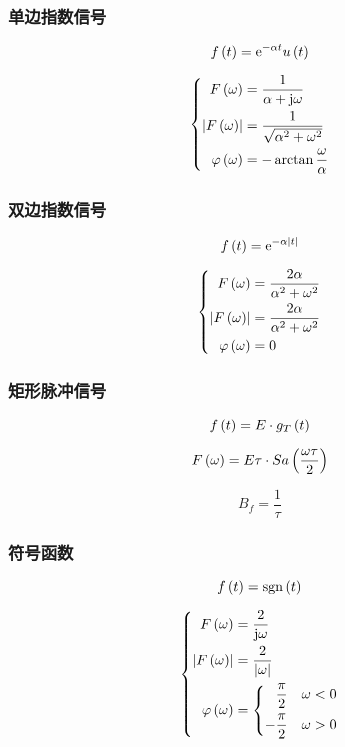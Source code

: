 \documentclass{article}
\begin{document}
\subsubsection{单边指数信号}

\[f\left(t\right)=\mathrm e^{-\alpha t}u\left(t\right)\]

\[\left\{\begin{aligned}
        F\left(\omega\right)       & =\frac1{\alpha+\mathrm j\omega}          \\
        \left|F\left(\omega\right)\right| & =\frac1{\sqrt{\alpha^2+\omega^2}} \\
        \varphi\left(\omega\right) & =-\arctan\frac\omega\alpha
    \end{aligned}\right.\]

\subsubsection{双边指数信号}

\[f\left(t\right)=\mathrm e^{-\alpha\left|t\right|}\]

\[\left\{\begin{aligned}
        F\left(\omega\right)       & =\frac{2\alpha}{\alpha^2+\omega^2} \\
        \left|F\left(\omega\right)\right| & =\frac{2\alpha}{\alpha^2+\omega^2} \\
        \varphi\left(\omega\right) & =0
    \end{aligned}\right.\]

\subsubsection{矩形脉冲信号}

\[f\left(t\right)=E\cdot g_T\left(t\right)\]

\[F\left(\omega\right)=E\tau\cdot Sa\left(\frac{\omega\tau}2\right)\]

\[B_f=\frac1\tau\]

\subsubsection{符号函数}

\[f\left(t\right)=\mathrm{sgn}\left(t\right)\]

\[\left\{\begin{aligned}
        F\left(\omega\right)       & =\frac2{\mathrm j\omega}   \\
        \left|F\left(\omega\right)\right| & =\frac2{\left|\omega\right|} \\
        \varphi\left(\omega\right) & =
        \left\{\begin{aligned}
                   \frac\pi2  &  & \omega<0 \\
                   -\frac\pi2 &  & \omega>0
               \end{aligned}\right.
    \end{aligned}\right.\]
\end{document}
